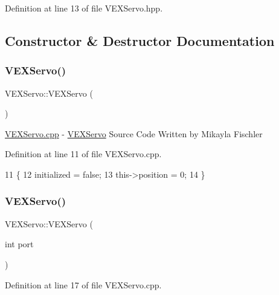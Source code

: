 Definition at line 13 of file V\+E\+X\+Servo.\+hpp.



\subsection{Constructor \& Destructor Documentation}
\mbox{\label{class_v_e_x_servo_a476b7bdb0ba79753347ed3bb9303be77}} 
\subsubsection{\texorpdfstring{V\+E\+X\+Servo()}{VEXServo()}\hspace{0.1cm}{\footnotesize\ttfamily [1/3]}}
{\footnotesize\ttfamily V\+E\+X\+Servo\+::\+V\+E\+X\+Servo (\begin{DoxyParamCaption}{ }\end{DoxyParamCaption})}

\hyperlink{_v_e_x_servo_8cpp}{V\+E\+X\+Servo.\+cpp} -\/ \hyperlink{class_v_e_x_servo}{V\+E\+X\+Servo} Source Code Written by Mikayla Fischler 

Definition at line 11 of file V\+E\+X\+Servo.\+cpp.


\begin{DoxyCode}
11                    \{
12     initialized = \textcolor{keyword}{false};
13     this->position = 0;
14 \}
\end{DoxyCode}
\mbox{\label{class_v_e_x_servo_ade28b71edfd878f947a63bbec722036b}} 
\subsubsection{\texorpdfstring{V\+E\+X\+Servo()}{VEXServo()}\hspace{0.1cm}{\footnotesize\ttfamily [2/3]}}
{\footnotesize\ttfamily V\+E\+X\+Servo\+::\+V\+E\+X\+Servo (\begin{DoxyParamCaption}\item[{int}]{port }\end{DoxyParamCaption})}



Definition at line 17 of file V\+E\+X\+Servo.\+cpp.


